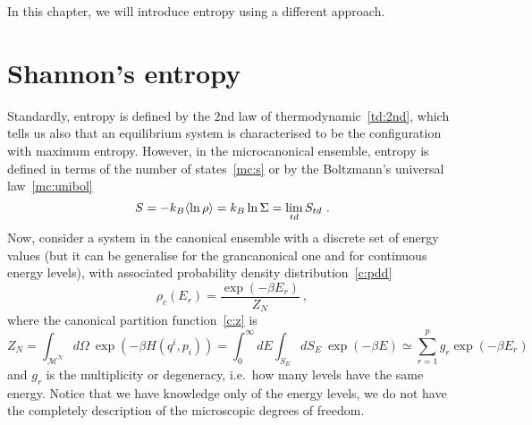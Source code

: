     In this chapter, we will introduce entropy using a different approach. 
    
\section{Shannon's entropy} 
    
    Standardly, entropy is defined by the $2$nd law of thermodynamic~\eqref{td:2nd}, which tells us also that an equilibrium system is characterised to be the configuration with maximum entropy. However, in the microcanonical ensemble, entropy is defined in terms of the number of states~\eqref{mc:s} or by the Boltzmann's universal law~\eqref{mc:unibol}
    \begin{equation*}
        S = - k_B \langle\ln \rho\rangle = k_B \ln \Sigma = \lim_{td} S_{td} ~.
    \end{equation*}
    Now, consider a system in the canonical ensemble with a discrete set of energy values (but it can be generalise for the grancanonical one and for continuous energy levels), with associated probability density distribution~\eqref{c:pdd}
    \begin{equation*}
        \rho_c (E_r) = \frac{\exp(-\beta E_r)}{Z_N} ~,
    \end{equation*}
    where the canonical partition function~\eqref{c:z} is 
    \begin{equation*}
        Z_N = \int_{\mathcal M^N} d\Omega~ \exp(-\beta H(q^i, p_i)) = \int_0^\infty dE \int_{S_E} dS_E ~ \exp(-\beta E) \simeq \sum_{r=1}^{p} g_r \exp(-\beta E_r)
    \end{equation*}
    and $g_r$ is the multiplicity or degeneracy, i.e.~how many levels have the same energy. Notice that we have knowledge only of the energy levels, we do not have the completely description of the microscopic degrees of freedom.

